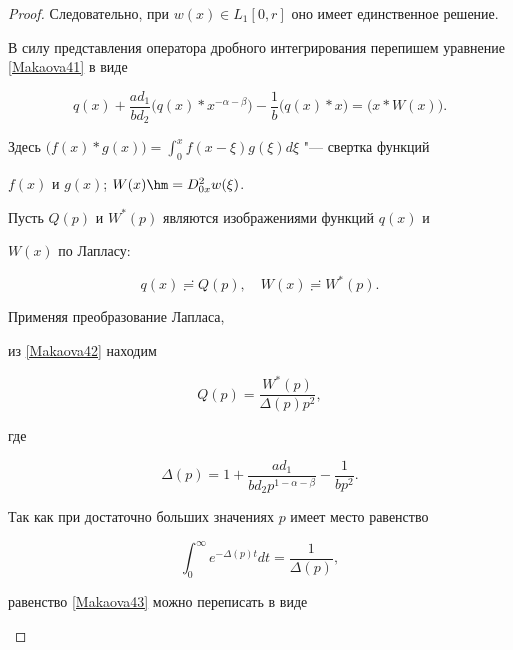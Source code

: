\begin{proof}
Следовательно, при  $w(x) \in L_1[0,r]$  оно имеет единственное решение.



В силу представления оператора дробного интегрирования перепишем уравнение \eqref{Makaova41} в виде 

 \begin{equation}

\label{Makaova42} 

q(x)+\frac{ad_1}{bd_2} \bigl(q(x)* x^{-\alpha-\beta}\bigr)-\frac{1}{b}

\bigl(q(x)*x\bigr)=\bigl(x*W(x)\bigr). 

 \end{equation} 

Здесь $ \displaystyle \bigl (f(x)*g(x)\bigr)=\int _{0}^{x}f(x-\xi)g(\xi) d\xi $  "--- свертка функций 

$f(x)$ и $g(x)$; $W(x)\hm =D^2_{0x}w(\xi)$.



Пусть $Q(p)$ и $W^*(p)$ являются изображениями функций $q(x)$ и 

$W(x)$ по Лапласу:

$$

q(x)\risingdotseq Q(p),\quad  W(x) \risingdotseq W^*(p).$$

Применяя преобразование Лапласа, 

из \eqref{Makaova42} находим

\begin{equation}

\label{Makaova43} 

Q(p)=\frac{ W^*(p)}{\Delta(p)p^{2}},

 \end{equation} 

 где 

\[

\Delta(p)=1+\frac{ad_1}{bd_2p^{1-\alpha-\beta}}-\frac{1}{bp^{2}}.

\]

Так как при достаточно больших значениях $p$  имеет место равенство 

\[

\int _{0}^{\infty}e^{-\Delta (p)t}dt=\frac{1}{\Delta (p)},

\]

 равенство \eqref{Makaova43} можно переписать в виде

\begin{equation}

\label{Makaova44} 


\end{equation}
\end{proof}
